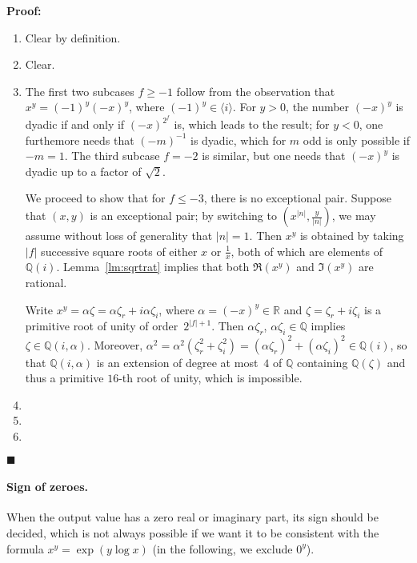 \documentclass [11pt]{article}
\newcommand {\Q}{\mathbb Q}
\newcommand {\R}{\mathbb R}
\renewcommand {\leq}{\leqslant}
\renewcommand {\geq}{\geqslant}
\newenvironment{proof}{\noindent \textbf {Proof:}}{{\hspace* {\fill}$\blacksquare$}}
\begin{document}
\begin {proof}
\begin {enumerate}
\item
Clear by definition.
\item
Clear.
\item
The first two subcases $f \geq -1$ follow from the observation that
$x^y = (-1)^y (-x)^y$, where $(-1)^y \in \langle i \rangle$.
For $y > 0$, the number $(-x)^y$ is dyadic if and only if $(-x)^{2^f}$ is,
which leads to the result; for $y < 0$, one furthemore needs that
$(-m)^{-1}$ is dyadic, which for $m$ odd is only possible if $-m = 1$.
The third subcase $f = -2$ is similar, but one needs that $(-x)^y$ is dyadic
up to a factor of $\sqrt 2$.

We proceed to show that for $f \leq -3$, there is no exceptional pair.
Suppose that $(x, y)$ is an exceptional pair; by switching to
$\left( x^{|n|}, \frac {y}{|n|} \right)$, we may assume
without loss of generality that $|n| = 1$. Then $x^y$ is obtained by
taking $|f|$ successive square roots of either $x$ or $\frac {1}{x}$, both
of which are elements of $\Q (i)$. Lemma~\ref {lm:sqrtrat} implies
that both $\Re (x^y)$ and $\Im (x^y)$ are rational.

Write $x^y = \alpha \zeta = \alpha \zeta_r + i \alpha \zeta_i$, where
$\alpha = (-x)^y \in \R$ and $\zeta = \zeta_r + i \zeta_i$ is a primitive root
of unity of order~$2^{|f| + 1}$.
Then $\alpha \zeta_r$, $\alpha \zeta_i \in \Q$ implies $\zeta \in \Q (i, \alpha)$.
Moreover,
$\alpha^2 = \alpha^2 (\zeta_r^2 + \zeta_i^2) =
(\alpha \zeta_r)^2 + (\alpha \zeta_i)^2 \in \Q (i)$, so that $\Q (i, \alpha)$
is an extension of degree at most~$4$ of $\Q$ containing $\Q (\zeta)$
and thus a primitive $16$-th root of unity, which is impossible.
\item
\item
\item
\end {enumerate}
\end {proof}

\paragraph{Sign of zeroes.}
When the output value has a zero real or imaginary part, its sign should be
decided, which is not always possible if we want it to be consistent with the
formula $x^y = \exp(y\log x)$ (in the following, we exclude $0^y$).
\end{document}
